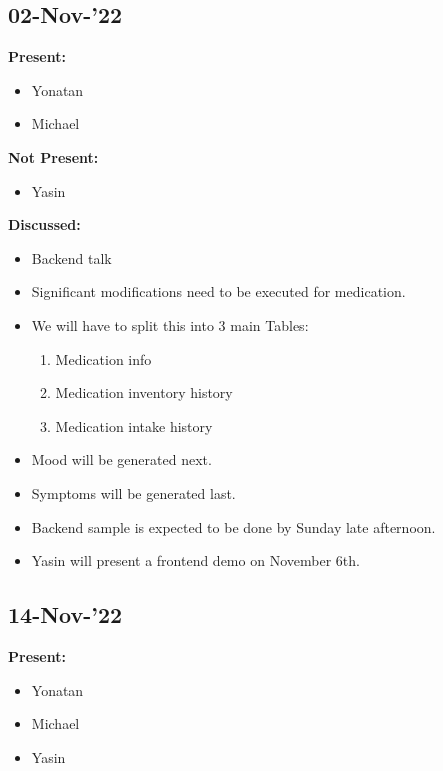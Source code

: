 \documentclass[11pt]{article}
\begin{document}
    \subsection{02-Nov-’22}\label{subsec:02-nov-22}

    \textbf{Present:}
    \begin{itemize}
        \item Yonatan
        \item Michael
    \end{itemize}

    \textbf{Not Present:}

    \begin{itemize}
        \item Yasin
    \end{itemize}

    \textbf{Discussed:}
    \begin{itemize}
        \item Backend talk
        \item Significant modifications need to be executed for medication.
        \item We will have to split this into 3 main Tables:
        \begin{enumerate}
            \item Medication info
            \item Medication inventory history
            \item Medication intake history
        \end{enumerate}
        \item Mood will be generated next.
        \item Symptoms will be generated last.
        \item Backend sample is expected to be done by Sunday late afternoon.
        \item Yasin will present a frontend demo on November 6th.
    \end{itemize}

    \subsection{14-Nov-’22}\label{subsec:14-nov-22}

    \textbf{Present:}
    \begin{itemize}
        \item Yonatan
        \item Michael
        \item Yasin
    \end{itemize}
\end{document}
